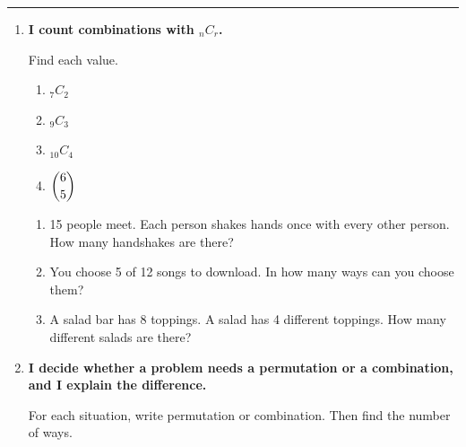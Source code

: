 \documentclass[11pt]{article}
\newcommand{\lessonhead}[1]{\par\vspace{0.6em}{\large\bfseries #1}\par\vspace{0.25em}\hrule\vspace{0.6em}}
\newcommand{\goal}[1]{\textbf{#1}\par\vspace{0.35em}}
\begin{document}
\newpage
\lessonhead{6.6 - Combinations}
\begin{enumerate}[resume]

\item \goal{I count combinations with ${}_nC_r$.}
Find each value.
\begin{enumerate}
  \item ${}_7C_2$ 
  \work{3em}
  \item ${}_9C_3$ 
  \work{3em}
  \item ${}_{10}C_4$ 
  \work{3em}
  \item $\dbinom{6}{5}$ 
  \work{3em}
\end{enumerate}
\begin{enumerate}[start=5]
  \item 15 people meet. Each person shakes hands once with every other person. How many handshakes are there?

  \work{3.5em}
  \item You choose 5 of 12 songs to download. In how many ways can you choose them?

  \work{3.5em}
  \item A salad bar has 8 toppings. A salad has 4 different toppings. How many different salads are there?

  \work{3.5em}
\end{enumerate}

\newpage
\item \goal{I decide whether a problem needs a permutation or a combination, and I explain the difference.}
For each situation, write permutation or combination. Then find the number of ways.


\end{enumerate}
\end{document}
